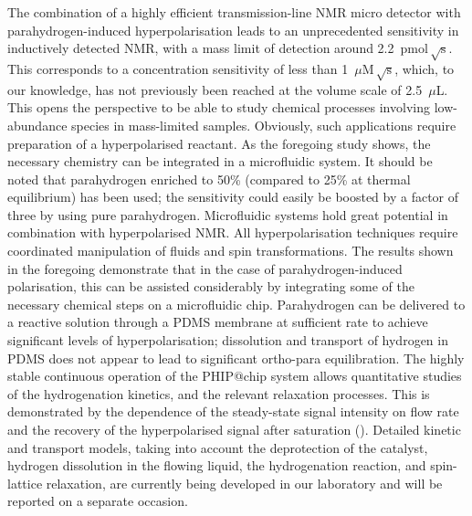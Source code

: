 The combination of a
highly efficient transmission-line NMR micro detector with para\-hyd\-ro\-gen-in\-duced
hyper\-polarisation leads to an un\-precedented sensitivity in inductively detected
NMR, with a mass limit of detection around 2.2~$\text{pmol}\,\sqrt{\mathrm{s}}$.
This corresponds to a concentration sensitivity of less than 1~$\mu \mathrm{M}\,\sqrt{\text{s}}$,
which, to our knowledge, has not previously been reached at the volume
scale of 2.5~$\mu$L.
This opens the perspective to be able to study chemical processes involving
low-abundance species in mass-limited samples. Obviously, such applications
require preparation of a hyperpolarised reactant. As the foregoing study shows,
the necessary chemistry can be integrated in a microfluidic system.
It should be noted that
parahydrogen enriched to 50\% (compared to 25\%
at thermal equilibrium) has been used; the sensitivity
could easily be boosted by a factor of three by using pure parahydrogen.
Microfluidic systems hold great potential in combination
with hyperpolarised NMR. All hyperpolarisation techniques require coordinated
manipulation of fluids and spin transformations. The results shown in the
foregoing demonstrate that in the case of parahydrogen-induced polarisation,
this can be assisted considerably by integrating some of the necessary chemical
steps on a microfluidic chip. Parahydrogen can be delivered to a reactive
solution through a PDMS membrane at sufficient rate to achieve significant
levels of hyperpolarisation; dissolution and transport of hydrogen in PDMS does
not appear to lead to significant ortho-para equilibration.
The highly stable continuous operation
of the PHIP@chip system allows quantitative studies
of the hydrogenation kinetics, and the relevant relaxation processes.
This is demonstrated by the dependence of the steady-state signal intensity on
flow rate and the recovery of the
hyperpolarised signal after saturation ().
Detailed kinetic and transport models, taking into account
the deprotection of the catalyst, hydrogen dissolution in the flowing
liquid, the hydrogenation reaction, and spin-lattice relaxation,
are currently being developed in our laboratory and will be reported
on a separate occasion.

